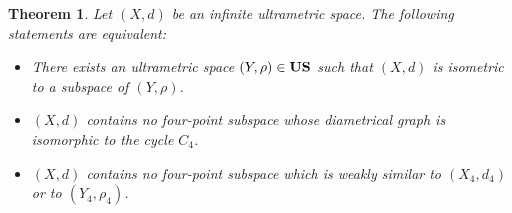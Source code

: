 \documentclass[11pt]{article}
\newtheorem{theorem}{Theorem}[section]
\theoremstyle{definition}
\theoremstyle{remark}
\numberwithin{equation}{section}
\begin{document}
\begin{theorem}\label{mnb}
Let $(X,d)$ be an infinite ultrametric space. The following statements are equivalent:
\begin{itemize}[left=10pt]
\item[(i)] There exists an ultrametric space $(Y,\rho)\in {\bf US}$ such that $(X,d)$ is isometric to a subspace of $(Y,\rho)$.
\item[(ii)] $(X,d)$ contains no four-point subspace whose diametrical graph is isomorphic to the cycle $C_4$.

\item[(iii)] $(X,d)$ contains no four-point subspace which is weakly similar to $(X_4,d_4)$ or to $(Y_4,\rho_4)$.

\end{itemize}
\end{theorem}
\end{document}
